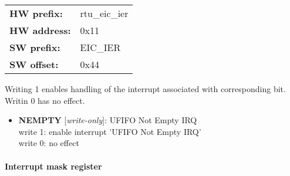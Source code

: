 \begin{tabular}{l l }
{\bf HW prefix:}  & rtu\_eic\_ier\\
{\bf HW address:}  & 0x11\\
{\bf SW prefix:}  & EIC\_IER\\
{\bf SW offset:}  & 0x44\\
\end{tabular}

\vspace{12pt}
Writing 1 enables handling of the interrupt associated with corresponding bit. Writin 0 has no effect.

\vspace{12pt}
\noindent
{}

\begin{itemize}
\item \begin{small}
{\bf 
NEMPTY
} [\emph{write-only}]: UFIFO Not Empty IRQ
\\
write 1: enable interrupt 'UFIFO Not Empty IRQ'\\write 0: no effect
\end{small}
\end{itemize}
\paragraph*{Interrupt mask register}\vspace{12pt}

